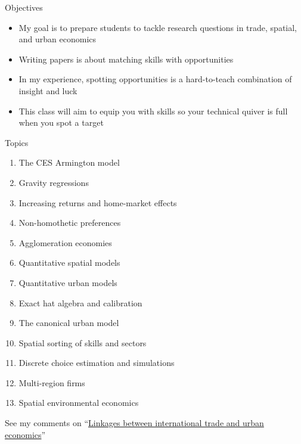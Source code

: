 \documentclass[10pt,notes=hide]{beamer}
\begin{document}
\begin{frame}{Objectives}
\begin{itemize}
\item My goal is to prepare students to tackle research questions in trade, spatial, and urban economics
\item Writing papers is about matching skills with opportunities
\item In my experience, spotting opportunities is a hard-to-teach combination of insight and luck
\item This class will aim to equip you with skills so your technical quiver is full when you spot a target
\end{itemize}
\end{frame}
\begin{frame}{Topics}
\begin{enumerate}
\item The CES Armington model
\item Gravity regressions
\item Increasing returns and home-market effects
\item Non-homothetic preferences
\item Agglomeration economies
\item Quantitative spatial models
\item Quantitative urban models
\item Exact hat algebra and calibration
\item The canonical urban model
\item Spatial sorting of skills and sectors
\item Discrete choice estimation and simulations
\item Multi-region firms
\item Spatial environmental economics
\end{enumerate}
See my comments on ``\href{https://tradediversion.net/2017/09/17/linkages-between-international-trade-and-urban-economics/}{Linkages between international trade and urban economics}''
\end{frame}
\end{document}
